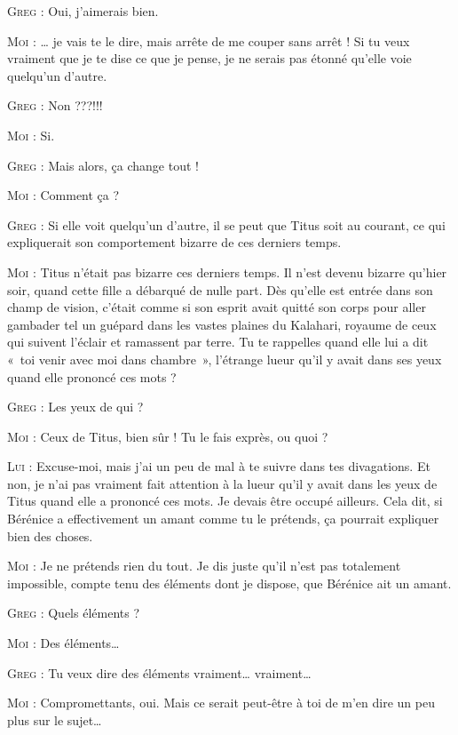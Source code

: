 \begin{dialogue}
\textsc{Greg} : Oui, j’aimerais bien.

\textsc{Moi} : … je vais te le dire, mais arrête de me couper sans arrêt ! Si tu veux vraiment que je te dise ce que je pense, je ne serais pas étonné qu’elle voie quelqu’un d’autre.

\textsc{Greg} : Non ???!!!

\textsc{Moi} : Si.

\textsc{Greg} : Mais alors, ça change tout !

\textsc{Moi} : Comment ça ?

\textsc{Greg} : Si elle voit quelqu’un d’autre, il se peut que Titus soit au courant, ce qui expliquerait son comportement bizarre de ces derniers temps.

\illusloflabel{}%

\textsc{Moi} : Titus n’était pas bizarre ces derniers temps. Il n’est devenu bizarre qu’hier soir, quand cette fille a débarqué de nulle part. Dès qu’elle est entrée dans son champ de vision, c’était comme si son esprit avait quitté son corps pour aller gambader tel un guépard dans les vastes plaines du Kalahari, royaume de ceux qui suivent l’éclair et ramassent par terre. Tu te rappelles quand elle lui a dit «~toi venir avec moi dans chambre~», l’étrange lueur qu’il y avait dans ses yeux quand elle prononcé ces mots ?

\textsc{Greg} : Les yeux de qui ?

\textsc{Moi} : Ceux de Titus, bien sûr ! Tu le fais exprès, ou quoi ?

\textsc{Lui} : Excuse-moi, mais j’ai un peu de mal à te suivre dans tes divagations. Et non, je n’ai pas vraiment fait attention à la lueur qu’il y avait dans les yeux de Titus quand elle a prononcé ces mots. Je devais être occupé ailleurs. Cela dit, si Bérénice a effectivement un amant comme tu le prétends, ça pourrait expliquer bien des choses.

\textsc{Moi} : Je ne prétends rien du tout. Je dis juste qu’il n’est pas totalement impossible, compte tenu des éléments dont je dispose, que Bérénice ait un amant.

\textsc{Greg} : Quels éléments ?

\textsc{Moi} : Des éléments…

\textsc{Greg} : Tu veux dire des éléments vraiment… vraiment…

\textsc{Moi} : Compromettants, oui. Mais ce serait peut-être à toi de m’en dire un peu plus sur le sujet…


\end{dialogue}
